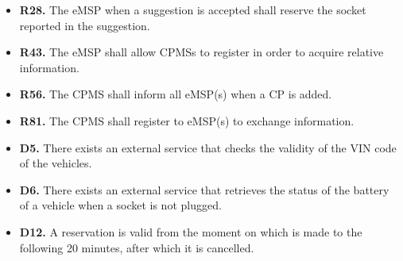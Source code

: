 \documentclass{Configuration_Files/PoliMi3i_thesis}
\begin{document}
\begin{enumerate}[label=\textbf{G\arabic*}]
\begin{itemize}
            \item \textbf{R28.} The eMSP when a suggestion is accepted shall reserve the socket reported in the suggestion.
            \item \textbf{R43.} The eMSP shall allow CPMSs to register in order to acquire relative information.
            \item \textbf{R56.} The CPMS shall inform all eMSP(s) when a CP is added.
            \item \textbf{R81.} The CPMS shall register to eMSP(s) to exchange information.
            \item \textbf{D5.} There exists an external service that checks the validity of the VIN code of the vehicles.
            \item \textbf{D6.} There exists an external service that retrieves the status of the battery of a vehicle when a socket is not plugged.
            \item \textbf{D12.} A reservation is valid from the moment on which is made to the following 20 minutes, after which it is cancelled.
        \end{itemize}


\end{enumerate}
\end{document}
